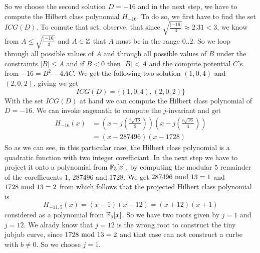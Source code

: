 \begin{example}
So we choose the second solution $D=-16$ and in the next step, we have to compute the Hilbert class polynomial $H_{-16}$. To do so, we first have to find the set $ICG(D)$. To comute that set, observe, that since $\sqrt{\frac{|-16|}{3}}\approx 2.31<3$, we know from $A\leq \sqrt{\frac{|-16|}{3}}$ and $A\in\mathbb{Z}$ that $A$ must be in the range $0..2$. So we loop through all possible values of $A$ and through all possible values of $B$ under the constraints $|B|\leq A$ and if $B<0$ then $|B|<A$
and the compute potential $C$'s from $-16 = B^2 -4AC$. We get the following two solution $(1,0,4)$ and $(2,0,2)$, giving  
we get
$$
ICG(D)=\{(1,0,4),(2,0,2)\}
$$
With the set $ICG(D)$ at hand we can compute the Hilbert class polynomial of $D=-16$. We can invoke sagemath to compute the $j$-invariant and get 
\begin{align*}
H_{-16}(x) &= \left(x - j\left(\frac{i\sqrt{16}}{2}\right)\right)
 \left(x - j\left(\frac{i\sqrt{16}}{4}\right)\right) \\
           &= (x- 287496)(x-1728)
\end{align*}
So as we can see, in this particular case, the Hilbert class polynomial is a quadratic function with two integer corefficiant. In the next step we have to project it onto a polynomial from $\mathbb{F}_5[x]$, by computing the modular $5$ remainder of the corefficuents $1$, $287496$ and $1728$. We get $287496 \text{ mod } 13=1$ and $1728 \text{ mod } 13=2$ from which follows that the projected Hilbert class polynomial is  
$$
H_{-11,5}(x)=(x-1)(x-12)= (x+12)(x+1)
$$ 
considered as a polynomial from $\mathbb{F}_5[x]$. So we have two roots given by $j=1$ and $j=12$. We alrady know that $j=12$ is the wrong root to construct the tiny jubjub curve, since $1728 \text{ mod } 13=2$ and that case can not construct a curbe with $b\neq 0$. So we choose $j=1$.


\end{example}
